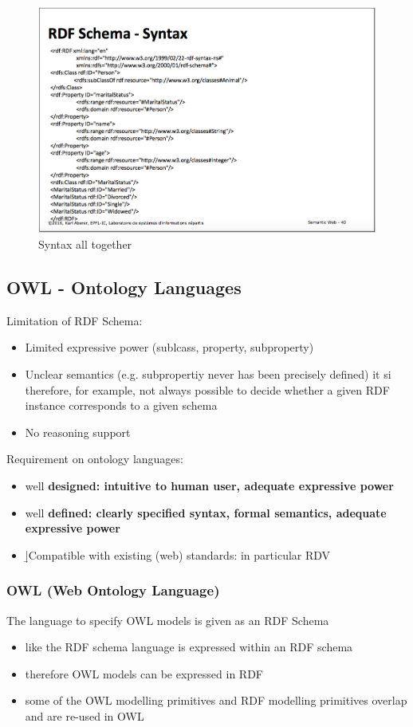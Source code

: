 \begin{figure}[H]
\begin{center}
\includegraphics[width=1\linewidth]{figures/rdf_syntax.png}
\end{center}
\caption{Syntax all together}
\label{fig:class}
\end{figure}

\subsection{OWL - Ontology Languages}
Limitation of RDF Schema:
\begin{itemize}
	\item Limited expressive power (sublcass, property, subproperty)
	\item Unclear semantics (e.g. subpropertiy never has been precisely defined) it si therefore, for example, not always possible to decide whether a given RDF instance corresponds to a given schema
	\item No reasoning support
\end{itemize}

Requirement on ontology languages:
\begin{itemize}
	\item well \bf{designed}: intuitive to human user, adequate expressive power
	\item well \bf{defined}: clearly specified syntax, formal semantics, adequate expressive power
	\item \b{|Compatible} with existing (web) standards: in particular RDV	
\end{itemize}

\subsubsection{OWL (Web Ontology Language)}
The language to specify OWL models is given as an RDF Schema
\begin{itemize}
	\item like the RDF schema language is expressed within an RDF schema
	\item therefore OWL models can be expressed in RDF
	\item some of the OWL modelling primitives and RDF modelling primitives overlap and are re-used in OWL 
\end{itemize}

